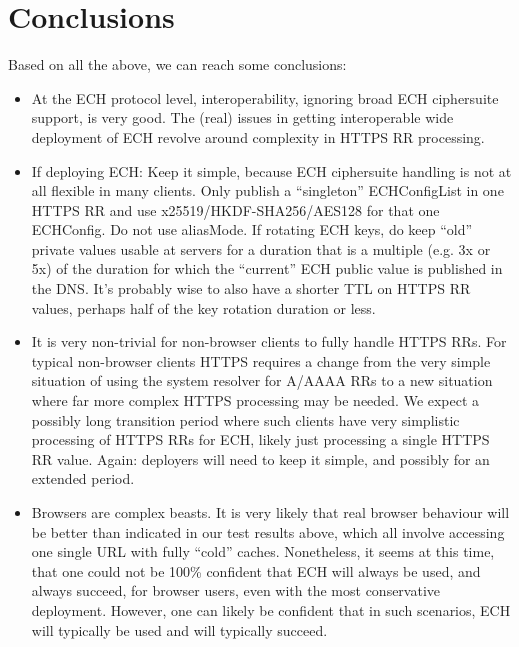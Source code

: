 \section{Conclusions}

Based on all the above, we can reach some conclusions:

\begin{itemize}

    \item
        At the ECH protocol level, interoperability, ignoring broad ECH
        ciphersuite support, is very good. The (real) issues in getting
        interoperable wide deployment of ECH revolve around complexity in HTTPS
        RR processing.

    \item
        If deploying ECH: Keep it simple, because ECH ciphersuite handling is
        not at all flexible in many clients. Only publish a ``singleton''
        ECHConfigList in one HTTPS RR and use x25519/HKDF-SHA256/AES128 for
        that one ECHConfig. Do not use aliasMode. If rotating ECH keys, do keep
        ``old'' private values usable at servers for a duration that is a
        multiple (e.g. 3x or 5x) of the duration for which the ``current'' ECH
        public value is published in the DNS. It's probably wise to also have a
        shorter TTL on HTTPS RR values, perhaps half of the key rotation
        duration or less.

    \item
        It is very non-trivial for non-browser clients to fully handle HTTPS
        RRs.  For typical non-browser clients HTTPS requires a change from the
        very simple situation of using the system resolver for A/AAAA RRs to a
        new situation where far more complex HTTPS processing may be needed. We
        expect a possibly long transition period where such clients have very
        simplistic processing of HTTPS RRs for ECH, likely just processing a
        single HTTPS RR value. Again: deployers will need to keep it simple,
        and possibly for an extended period.

    \item
        Browsers are complex beasts. It is very likely that real browser
        behaviour will be better than indicated in our test results above,
        which all involve accessing one single URL with fully ``cold'' caches.
        Nonetheless, it seems at this time, that one could not be 100\%
        confident that ECH will always be used, and always succeed, for browser
        users, even with the most conservative deployment. However, one can
        likely be confident that in such scenarios, ECH will typically be used
        and will typically succeed.

\end{itemize}

